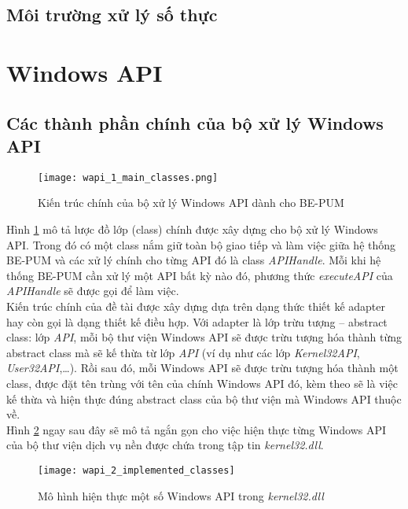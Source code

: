 	\subsection*{Môi trường xử lý số thực}
	

		
\newpage
\section{Windows API} \label{sec:wapi_design}

	\subsection{Các thành phần chính của bộ xử lý Windows API} \label{sec:main_classes}

	\begin{figure}[htp]
	\centering
		\texttt{[image: wapi\_1\_main\_classes.png]}
		\caption{Kiến trúc chính của bộ xử lý Windows API dành cho BE-PUM}	
		\label{fig:wapi_1_main_classes}		
	\end{figure}

Hình \ref{fig:wapi_1_main_classes} mô tả lược đồ lớp (class) chính được xây dựng cho bộ xử lý Windows API. Trong đó có một class nắm giữ toàn bộ giao tiếp và làm việc giữa hệ thống BE-PUM và các xử lý chính cho từng API đó là class \textit{APIHandle}. Mỗi khi hệ thống BE-PUM cần xử lý một API bất kỳ nào đó, phương thức \textit{executeAPI} của \textit{APIHandle} sẽ được gọi để làm việc.\\

Kiến trúc chính của đề tài được xây dựng dựa trên dạng thức thiết kế adapter hay còn gọi là dạng thiết kế điều hợp. Với adapter là lớp trừu tượng – abstract class: lớp \textit{API}, mỗi bộ thư viện Windows API sẽ được trừu tượng hóa thành từng abstract class mà sẽ kế thừa từ lớp \textit{API} (ví dụ như các lớp \textit{Kernel32API}, \textit{User32API},…). Rồi sau đó, mỗi Windows API sẽ được trừu tượng hóa thành một class, được đặt tên trùng với tên của chính Windows API đó, kèm theo sẽ là việc kế thừa và hiện thực đúng abstract class của bộ thư viện mà Windows API thuộc về.\\

Hình \ref{fig:wapi_2_implemented_classes} ngay sau đây sẽ mô tả ngắn gọn cho việc hiện thực từng Windows API của bộ thư viện dịch vụ nền được chứa trong tập tin \textit{kernel32.dll}.

	\begin{figure}[htp]
	\centering
		\texttt{[image: wapi\_2\_implemented\_classes]}
		\caption{Mô hình hiện thực một số Windows API trong \textit{kernel32.dll}}	
		\label{fig:wapi_2_implemented_classes}		
	\end{figure}

